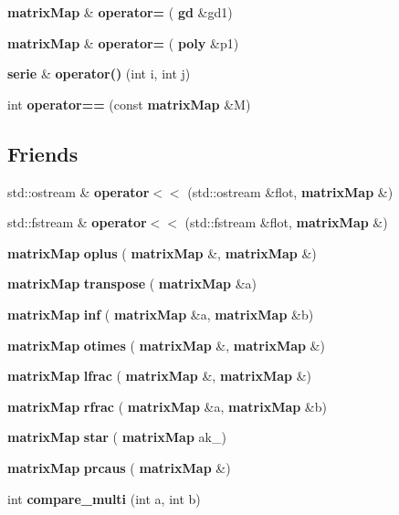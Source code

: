 \begin{DoxyCompactItemize}
\item 
\mbox{\label{classmmgd_1_1matrix_map_afea64a008d7ab29b485435e41eda8a2b}} 
\textbf{ matrix\+Map} \& {\bfseries operator=} (\textbf{ gd} \&gd1)
\item 
\mbox{\label{classmmgd_1_1matrix_map_aff6df0e0fe65bd9e1f8b2a2ad8cd4590}} 
\textbf{ matrix\+Map} \& {\bfseries operator=} (\textbf{ poly} \&p1)
\item 
\mbox{\label{classmmgd_1_1matrix_map_aea5086267992a245e227dc1d574b709d}} 
\textbf{ serie} \& {\bfseries operator()} (int i, int j)
\item 
\mbox{\label{classmmgd_1_1matrix_map_ab11fc2d81d82223ec54fb5a36b075c2b}} 
int {\bfseries operator==} (const \textbf{ matrix\+Map} \&M)
\end{DoxyCompactItemize}
\subsection*{Friends}
\begin{DoxyCompactItemize}
\item 
\mbox{\label{classmmgd_1_1matrix_map_aa2dc7e04dbcdbb7ca2a8a03c2b1584ba}} 
std\+::ostream \& {\bfseries operator$<$$<$} (std\+::ostream \&flot, \textbf{ matrix\+Map} \&)
\item 
\mbox{\label{classmmgd_1_1matrix_map_a7ccdc35fb0b8a16649563197d1f34aad}} 
std\+::fstream \& {\bfseries operator$<$$<$} (std\+::fstream \&flot, \textbf{ matrix\+Map} \&)
\item 
\mbox{\label{classmmgd_1_1matrix_map_ac1ae6c71ab471acd13864b225c250da0}} 
\textbf{ matrix\+Map} {\bfseries oplus} (\textbf{ matrix\+Map} \&, \textbf{ matrix\+Map} \&)
\item 
\mbox{\label{classmmgd_1_1matrix_map_a2b1b8ace98d4164d2314ae6bc401867c}} 
\textbf{ matrix\+Map} {\bfseries transpose} (\textbf{ matrix\+Map} \&a)
\item 
\mbox{\label{classmmgd_1_1matrix_map_a21009c560d767adf1859f631946d265a}} 
\textbf{ matrix\+Map} {\bfseries inf} (\textbf{ matrix\+Map} \&a, \textbf{ matrix\+Map} \&b)
\item 
\textbf{ matrix\+Map} \textbf{ otimes} (\textbf{ matrix\+Map} \&, \textbf{ matrix\+Map} \&)
\item 
\textbf{ matrix\+Map} \textbf{ lfrac} (\textbf{ matrix\+Map} \&, \textbf{ matrix\+Map} \&)
\item 
\textbf{ matrix\+Map} \textbf{ rfrac} (\textbf{ matrix\+Map} \&a, \textbf{ matrix\+Map} \&b)
\item 
\mbox{\label{classmmgd_1_1matrix_map_ac1879b0a5a473e31a317539b5bd092c7}} 
\textbf{ matrix\+Map} {\bfseries star} (\textbf{ matrix\+Map} ak\+\_)
\item 
\mbox{\label{classmmgd_1_1matrix_map_a86c4b8974b035bc40108e226e04e9fa7}} 
\textbf{ matrix\+Map} {\bfseries prcaus} (\textbf{ matrix\+Map} \&)
\item 
\mbox{\label{classmmgd_1_1matrix_map_a5a402de41b8a938df509553894c01fee}} 
int {\bfseries compare\+\_\+multi} (int a, int b)
\end{DoxyCompactItemize}


